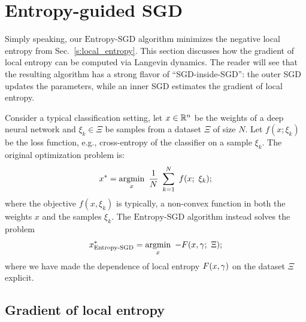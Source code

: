 \documentclass[10pt]{article}
\newcommand{\entropysgd}{\mathrm{Entropy}\textrm{-}\mathrm{SGD}}
\begin{document}
\section{Entropy-guided SGD}
\label{s:entropysgd}

Simply speaking, our $\entropysgd$ algorithm minimizes the negative local entropy from Sec.~\ref{s:local_entropy}. This section discusses how the gradient of local entropy can be computed via Langevin dynamics. The reader will see that the resulting algorithm has a strong flavor of ``SGD-inside-SGD'': the outer SGD updates the parameters, while an inner SGD estimates the gradient of local entropy.

Consider a typical classification setting, let $x \in \mathbb{R}^n$ be the weights of a deep neural network and $\xi_k \in \Xi$ be samples from a dataset $\Xi$ of size $N$. Let $f(x; \xi_k)$ be the loss function, e.g., cross-entropy of the classifier on a sample $\xi_k$. The original optimization problem is:
\begin{equation}
    x^* = \operatorname*{argmin}_x\ \frac{1}{N}\ \sum_{k=1}^N\ f(x;\ \xi_k);
    \label{eq:dnn_objective}
\end{equation}
where the objective $f(x, \xi_k)$ is typically, a non-convex function in both the weights $x$ and the samples $\xi_k$. The $\entropysgd$ algorithm instead solves the problem
\begin{equation}
    x^*_{\entropysgd} = \argmin_x\ -F(x, \gamma;\ \Xi);
    \label{eq:entropysgd_objective}
\end{equation}
where we have made the dependence of local entropy $F(x,\gamma)$ on the dataset $\Xi$ explicit.

\subsection{Gradient of local entropy}
\label{ss:grad_local_entropy}
\end{document}
